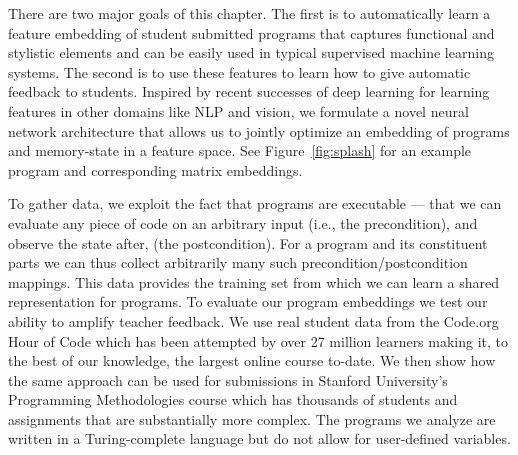 There are two major goals of this chapter.  The 
first is to automatically learn a feature embedding of 
student submitted programs
that captures functional and stylistic elements and can be easily
used in typical supervised machine learning systems.
The second is to use these features to learn
how to give automatic feedback to students. Inspired by recent successes of deep learning for learning features 
in other domains like NLP and vision, 
we formulate a novel neural network architecture 
that allows us to jointly optimize an embedding of programs and memory-state in a feature space.
See Figure~\ref{fig:splash} for an example program and corresponding matrix embeddings.


To gather data, we exploit the fact that programs are 
executable --- that we can evaluate any piece of code on 
an arbitrary input (i.e., the precondition), and observe the state  
after, (the postcondition). For a program and its 
constituent parts we can thus collect arbitrarily many such precondition/postcondition mappings. This %
data provides the training set from which we can learn a shared representation for programs. 
To evaluate our program embeddings we test our ability to amplify teacher feedback. We use real student data from the Code.org Hour of Code which has been attempted by over 27 million learners
making it, to the best of our knowledge,
the largest online course to-date. 
We then show how the same approach can be used for submissions in Stanford University's Programming Methodologies course which has thousands of students and assignments that are substantially more complex. The programs we analyze are written in a Turing-complete language but do not allow for user-defined variables.

